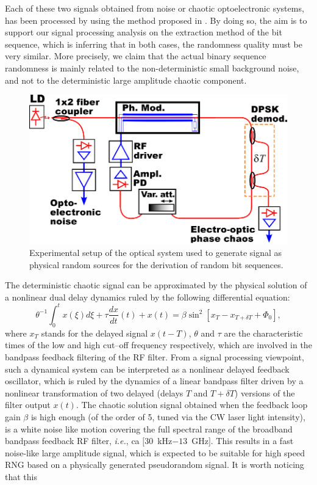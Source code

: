 Each of these two signals obtained from noise or chaotic optoelectronic systems, has been processed by using the method proposed in \cite{ultrafast2009}. By doing so, the aim is to support our signal processing analysis on the extraction method of the bit sequence, which is inferring that in both cases, the randomness quality must be very similar. More precisely, we claim that the actual binary sequence randomness is mainly related to the non-deterministic small background noise, and not to the deterministic large amplitude chaotic component.
%
\begin{figure}
  \centering
  \includegraphics[scale=0.75]{setup_opto_RNG.eps} %
  \hspace{0.5cm}
  \caption{Experimental setup of the optical system used to generate
    signal as physical random sources for the derivation of random bit
    sequences.}
  \label{opto_RNG}
\end{figure}
%
The deterministic chaotic signal can be approximated by the physical solution of a nonlinear dual delay dynamics ruled by the following differential equation:
%
\begin{equation}
  \theta^{-1}\int_0^tx(\xi)d\xi+\tau \frac{dx}{dt}(t)+x(t)=
  \beta\sin^2[x_T-x_{T+\delta T}+\Phi_0],  \label{DDE}
\end{equation}
%
where $x_T$ stands for the delayed signal $x(t-T)$, $\theta$ and $\tau$ are the characteristic times of the low and high cut--off frequency respectively, which are involved in the bandpass feedback filtering of the RF filter. From a signal processing viewpoint, such a dynamical system can be interpreted as a nonlinear delayed feedback oscillator, which is ruled by the dynamics of a linear bandpass filter driven by a nonlinear transformation of two delayed (delays $T$ and $T+\delta T$) versions of the filter output $x(t)$. The chaotic solution signal obtained when the feedback loop gain $\beta$ is high enough (of the order of 5, tuned via the CW laser light intensity), is a white noise like motion covering the full spectral range of the broadband bandpass feedback RF filter, \emph{i.e.}, ca $[30$~kHz$-13$~GHz$]$. This results in a fast noise-like large amplitude signal, which is expected to be suitable for high speed RNG based on a physically generated pseudorandom signal. It is worth noticing that this 
